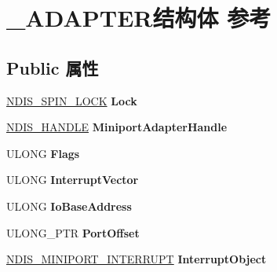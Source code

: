 \hypertarget{struct___a_d_a_p_t_e_r}{}\section{\+\_\+\+A\+D\+A\+P\+T\+E\+R结构体 参考}
\label{struct___a_d_a_p_t_e_r}
\subsection*{Public 属性}
\begin{DoxyCompactItemize}
\item 
\mbox{\label{struct___a_d_a_p_t_e_r_a1d6dd121e45590b96a2fb6b85dd82e3c}} 
\hyperlink{struct___n_d_i_s___s_p_i_n___l_o_c_k}{N\+D\+I\+S\+\_\+\+S\+P\+I\+N\+\_\+\+L\+O\+CK} {\bfseries Lock}
\item 
\mbox{\label{struct___a_d_a_p_t_e_r_aaef00b271382f01e0b7ad48f63c90767}} 
\hyperlink{interfacevoid}{N\+D\+I\+S\+\_\+\+H\+A\+N\+D\+LE} {\bfseries Miniport\+Adapter\+Handle}
\item 
\mbox{\label{struct___a_d_a_p_t_e_r_a84f1debebdb11ed115e981eb0bc539a0}} 
U\+L\+O\+NG {\bfseries Flags}
\item 
\mbox{\label{struct___a_d_a_p_t_e_r_a4913879d9da7b31f559957af217bef3f}} 
U\+L\+O\+NG {\bfseries Interrupt\+Vector}
\item 
\mbox{\label{struct___a_d_a_p_t_e_r_a472a920a1d1d2429fae2077499a4a18e}} 
U\+L\+O\+NG {\bfseries Io\+Base\+Address}
\item 
\mbox{\label{struct___a_d_a_p_t_e_r_acd2b519915fba46ae8892fc00e182545}} 
U\+L\+O\+N\+G\+\_\+\+P\+TR {\bfseries Port\+Offset}
\item 
\mbox{\label{struct___a_d_a_p_t_e_r_a8ec624962fc9cfcc07b1c0ac0c48f961}} 
\hyperlink{struct___n_d_i_s___m_i_n_i_p_o_r_t___i_n_t_e_r_r_u_p_t}{N\+D\+I\+S\+\_\+\+M\+I\+N\+I\+P\+O\+R\+T\+\_\+\+I\+N\+T\+E\+R\+R\+U\+PT} {\bfseries Interrupt\+Object}
\item 
\mbox{\label{struct___a_d_a_p_t_e_r_aa067feaf6b2238de4941f5fa16884d59}} 

\end{DoxyCompactItemize}
